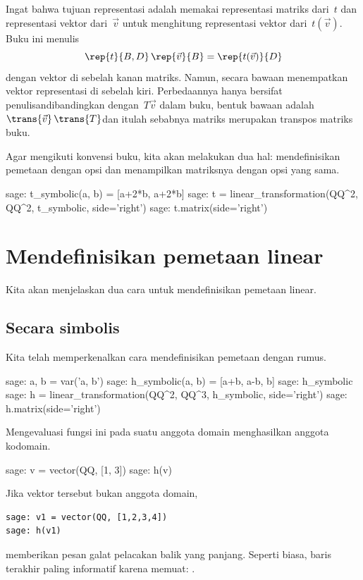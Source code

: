 Ingat bahwa tujuan representasi adalah memakai representasi matriks dari~$t$
dan representasi vektor dari~$\vec{v}$ untuk menghitung representasi vektor
dari~$t(\vec{v})$.
Buku ini menulis
\begin{equation*}
  \rep{t}{B,D}\,\rep{\vec{v}}{B}=\rep{t(\vec{v})}{D}
\end{equation*}
dengan vektor di sebelah kanan matriks.
Namun, secara bawaan \Sage{} menempatkan vektor representasi di sebelah kiri.
Perbedaannya hanya bersifat penulisan\Dash dibandingkan dengan~$T\vec{v}$
dalam buku, bentuk bawaan \Sage{} adalah
~$\trans{\vec{v}}\,\trans{T}$\Dash dan itulah sebabnya matriks \Sage{}
merupakan transpos matriks buku.

Agar \Sage{} mengikuti konvensi buku, kita akan melakukan dua hal:
mendefinisikan pemetaan dengan opsi  dan menampilkan
matriksnya dengan opsi yang sama.
\begin{sagecommandline}
sage: t_symbolic(a, b) = [a+2*b, a+2*b]         
sage: t = linear_transformation(QQ^2, QQ^2, t_symbolic, side='right')  
sage: t.matrix(side='right')
\end{sagecommandline}


  

\section{Mendefinisikan pemetaan linear}
Kita akan menjelaskan dua cara untuk mendefinisikan pemetaan linear.

\subsection{Secara simbolis}
Kita telah memperkenalkan cara mendefinisikan pemetaan dengan rumus.
\begin{sagecommandline}
sage: a, b = var('a, b')   
sage: h_symbolic(a, b) = [a+b, a-b, b]         
sage: h_symbolic       
sage: h = linear_transformation(QQ^2, QQ^3, h_symbolic, side='right')
sage: h.matrix(side='right') 
\end{sagecommandline}
Mengevaluasi fungsi ini pada suatu anggota domain menghasilkan anggota kodomain.
\begin{sagecommandline}
sage: v = vector(QQ, [1, 3])  
sage: h(v)
\end{sagecommandline}

Jika vektor tersebut bukan anggota domain,
\begin{lstlisting}
sage: v1 = vector(QQ, [1,2,3,4])
sage: h(v1)
\end{lstlisting}
\Sage{} memberikan pesan galat pelacakan balik yang panjang. Seperti biasa,
baris terakhir paling informatif karena memuat:
.

